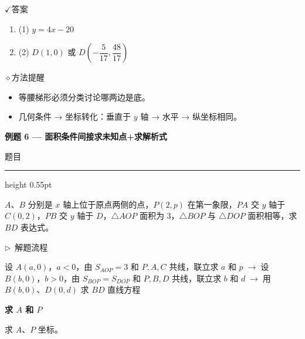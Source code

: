 \documentclass{exam-zh}
\newcommand{\edukai}{\kaishu}
\newcommand{\eduSectionTitle}[1]{%
  \needspace{5\baselineskip}%
  \vspace{2mm}
  {\color{edu-blue}\bfseries\large #1}\par
  \vspace{3mm}
}
\newenvironment{eduSubQuestionItem}[1]{%
  \needspace{4\baselineskip}%
  \vspace{2mm}
  \par\noindent
  \hangindent=8mm\hangafter=1
  {\color{edu-blue}\bfseries #1}\enspace
  \begingroup
  \color{edu-ink}
}{%
  \endgroup
  \par
  \vspace{3mm}
}
\newenvironment{eduAuxItem}[1]{%
  \needspace{4\baselineskip}%
  \vspace{2mm}
  \par\noindent
  \hangindent=8mm\hangafter=1
  {\color{edu-blue}\edukai $\triangleright$~#1}\enspace
  \begingroup
  \color{edu-ink}
  \edukai
}{%
  \endgroup
  \par
  \vspace{4mm}
}
\newcommand{\eduIconCheck}{\(\checkmark\)}
\newcommand{\eduIconPin}{\(\diamond\)}
\newenvironment{eduProblemBlock}[1][题目]{%
  \needspace{8\baselineskip}
  {\small\color{edu-muted}#1}\par
  \vspace{1.5mm}
  {\color{edu-blue}\hrule height 0.55pt}
  \vspace{4.5mm}
  \begingroup
  \color{edu-ink}
  \large
  \setlength{\parskip}{2.2mm}
  \linespread{1.20}\selectfont
}{%
  \par
  \endgroup
  \vspace{6mm}
}
\newenvironment{eduBulletList}{%
  \begin{itemize}[
    label=\textbullet,
    leftmargin=5mm,
    itemsep=1.2mm,
    topsep=0pt,
    parsep=0pt
  ]
}{%
  \end{itemize}
}
\newenvironment{eduBottomGrid}{%
  \vspace{1mm}
  \par\noindent
}{%
  \par\vspace{1mm}
}
\newenvironment{eduSummaryLeft}{%
  \begin{minipage}[t]{0.30\linewidth}
}{%
  \end{minipage}
}
\newcommand{\eduSummaryDivider}{%
  \hspace{4mm}{\color{edu-line}\vrule width 0.35pt}\hspace{7mm}%
}
\newenvironment{eduSummaryRight}{%
  \begin{minipage}[t]{0.58\linewidth}
}{%
  \end{minipage}
}
\newenvironment{eduPlainList}{%
  \begin{enumerate}[
    label=(\arabic*),
    leftmargin=7mm,
    itemsep=1.2mm,
    topsep=0pt,
    parsep=0pt
  ]
}{%
  \end{enumerate}
}
\begin{document}
\begin{eduBottomGrid}
  \begin{eduSummaryLeft}
    \begin{eduSummaryBlock}{\eduIconCheck}{答案}
    \begin{eduPlainList}
      \item (1) $y = 4x - 20$      \item (2) $D(1,0)$ 或 $D\left(-\dfrac{5}{17}, \dfrac{48}{17}\right)$    \end{eduPlainList}
    \end{eduSummaryBlock}
  \end{eduSummaryLeft}
  \eduSummaryDivider
  \begin{eduSummaryRight}
    \begin{eduSummaryBlock}{\eduIconPin}{方法提醒}
    \begin{eduBulletList}
      \item 等腰梯形必须分类讨论哪两边是底。      \item 几何条件 → 坐标转化：垂直于 $y$ 轴 → 水平 → 纵坐标相同。    \end{eduBulletList}
    \end{eduSummaryBlock}
  \end{eduSummaryRight}
\end{eduBottomGrid}



\eduSectionTitle{例题 6 — 面积条件间接求未知点+求解析式}

\begin{eduProblemBlock}[题目]
$A$、$B$ 分别是 $x$ 轴上位于原点两侧的点，$P(2,p)$ 在第一象限，$PA$ 交 $y$ 轴于 $C(0,2)$，$PB$ 交 $y$ 轴于 $D$，$\triangle AOP$ 面积为 $3$，$\triangle BOP$ 与 $\triangle DOP$ 面积相等，求 $BD$ 表达式。
\end{eduProblemBlock}









\begin{eduAuxItem}{解题流程}
设 $A(a,0)$，$a<0$，由 $S_{AOP}=3$ 和 $P,A,C$ 共线，联立求 $a$ 和 $p$$\;\to\;$设 $B(b,0)$，$b>0$，由 $S_{BOP}=S_{DOP}$ 和 $P,B,D$ 共线，联立求 $b$ 和 $d$$\;\to\;$用 $B(b,0)$、$D(0,d)$ 求 $BD$ 直线方程\end{eduAuxItem}




\begin{eduSubQuestionItem}{求 $A$ 和 $P$}
求 $A$、$P$ 坐标。\end{eduSubQuestionItem}
\end{document}
